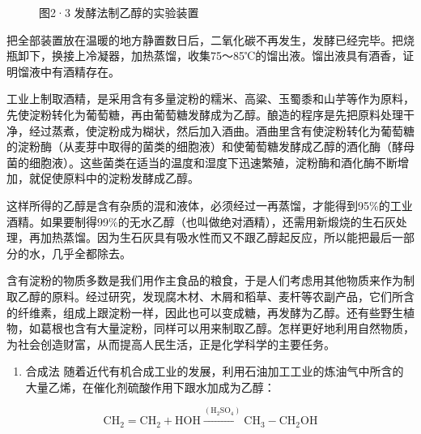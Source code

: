 \begin{figure}
{%
}
\caption{图2·3 发酵法制乙醇的实验装置}
\end{figure}

把全部装置放在温暖的地方静置数日后，二氧化碳不再发生，发酵已经完毕。把烧瓶卸下，换接上冷凝器，加热蒸馏，收集75～85℃的馏出液。馏出液具有酒香，证明馏液中有酒精存在。

工业上制取酒精，是采用含有多量淀粉的糯米、高粱、玉蜀黍和山芋等作为原料，先使淀粉转化为葡萄糖，再由葡萄糖发酵成为乙醇。酿造的程序是先把原料处理干净，经过蒸煮，使淀粉成为糊状，然后加入酒曲。酒曲里含有使淀粉转化为葡萄糖的淀粉酶（从麦芽中取得的菌类的细胞液）和使葡萄糖发酵成乙醇的酒化酶（酵母菌的细胞液）。这些菌类在适当的温度和湿度下迅速繁殖，淀粉酶和酒化酶不断增加，就促使原料中的淀粉发酵成乙醇。

这样所得的乙醇是含有杂质的混和液体，必须经过一再蒸馏，才能得到95\%的工业酒精。如果要制得99\%的无水乙醇（也叫做绝对酒精），还需用新煅烧的生石灰处理，再加热蒸馏。因为生石灰具有吸水性而又不跟乙醇起反应，所以能把最后一部分的水，几乎全都除去。

含有淀粉的物质多数是我们用作主食品的粮食，于是人们考虑用其他物质来作为制取乙醇的原料。经过研究，发现腐木材、木屑和稻草、麦杆等农副产品，它们所含的纤维素，组成上跟淀粉一样，因此也可以变成糖，再发酵为乙醇。还有些野生植物，如葛根也含有大量淀粉，同样可以用来制取乙醇。怎样更好地利用自然物质，为社会创造财富，从而提高人民生活，正是化学科学的主要任务。

\begin{enumerate}[start=2]
\item
  合成法
  随着近代有机合成工业的发展，利用石油加工工业的炼油气中所含的大量乙烯，在催化剂硫酸作用下跟水加成为乙醇：
\end{enumerate}

\[
\mathrm{CH} _ {2} = \mathrm{CH} _ {2} + \mathrm{HOH} \xrightarrow {\left(\mathrm{H} _ {2} \mathrm{SO} _ {4}\right)} \mathrm{CH} _ {3} - \mathrm{CH} _ {2} \mathrm{OH}
\]

